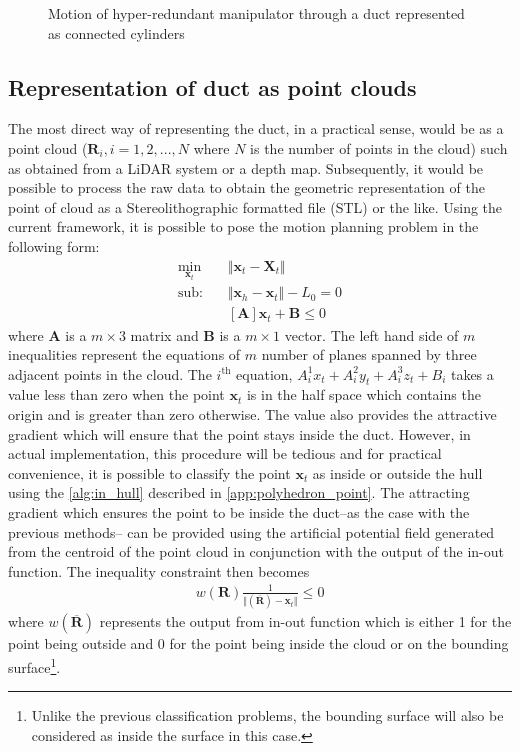 \documentclass[12pt,a4]{article}
\begin{document}
\begin{figure}[ht!]
\begin{subfigure}{0.31\textwidth}
    \end{subfigure}%
    
    \caption{ Motion of hyper-redundant manipulator through a duct represented as connected cylinders}
\end{figure}


\subsection{Representation of duct as point clouds}

The most direct way of representing the duct, in a practical sense, would be as a point cloud  ($\mathbf{R}_i,i=1,2,...,N$ where $N$ is the number of points in the cloud) such as obtained from a LiDAR system or a depth map. Subsequently, it would be possible to process the raw data to obtain the geometric representation of the point of cloud as a Stereolithographic formatted file (STL) or the like. Using the current framework, it is possible to pose the motion planning problem in the following form:
\begin{align}
\label{eq:STLeqs}
\min_{\textbf{x}_t} &\Vert \textbf{x}_t-\textbf{X}_t \Vert\\
\nonumber \text{sub:~~~} &\Vert \textbf{x}_h - \textbf{x}_t \Vert -L_0 = 0\\
&[\mathbf{A}]\mathbf{x}_t+\mathbf{B}\leq 0
\end{align}
where $\mathbf{A}$ is a $m\times 3$ matrix and $\mathbf{B}$ is a $m\times 1$ vector. The left hand side of $m$ inequalities represent the equations of $m$ number of planes spanned by three adjacent points in the cloud. The $i^\text{th}$ equation, $A_{i}^1x_t+A_{i}^2y_t+A_{i}^3z_t+B_i$ takes a value less than zero when the point $\mathbf{x}_t$ is in the half space which contains the origin and is greater than zero otherwise. The value also provides the attractive gradient which will ensure that the point stays inside the duct. However, in actual implementation, this procedure will be tedious and for practical convenience, it is possible to classify the point $\mathbf{x}_t$ as inside or outside the hull using the \cref{alg:in_hull} described in \cref{app:polyhedron_point}. The attracting gradient which ensures the point to be inside the duct--as the case with the previous methods-- can be provided using the artificial potential field generated from the centroid of the point cloud in conjunction with the output of the in-out function. The inequality constraint then becomes
\begin{align}
\label{eq:STLineq}
w(\mathbf{R})\frac{1}{\Vert(\overline{\mathbf{R}})-\mathbf{x}_t\Vert}\leq 0
\end{align}
where $w(\overline{\mathbf{R}})$ represents the output from in-out function which is either 1 for the point being outside and 0 for the point being inside the cloud or on the bounding surface\footnote{Unlike the previous classification problems, the bounding surface will also be considered as inside the surface in this case.}. 
\end{document}
